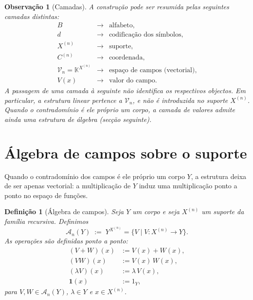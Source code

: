 \documentclass[11pt,a4paper]{article}
\newtheorem{definicao}{Definição}
\newtheorem{observacao}{Observação}
\begin{document}
\begin{observacao}[Camadas]
\label{obs:camadas-campo}
A construção pode ser resumida pelas seguintes camadas distintas:
\[
\begin{array}{rcl}
B &\longrightarrow& \text{alfabeto},\\[0.3em]
d &\longrightarrow& \text{codificação dos símbolos},\\[0.3em]
X^{(n)} &\longrightarrow& \text{suporte},\\[0.3em]
C^{(n)} &\longrightarrow& \text{coordenada},\\[0.3em]
\mathcal V_n=\mathbb K^{X^{(n)}} &\longrightarrow& \text{espaço de campos (vectorial)},\\[0.3em]
V(x) &\longrightarrow& \text{valor do campo}.
\end{array}
\]
A passagem de uma camada à seguinte não identifica os respectivos objectos.
Em particular, a estrutura linear pertence a \(\mathcal V_n\), e não é introduzida no suporte \(X^{(n)}\).
Quando o contradomínio é ele próprio um corpo, a camada de valores admite ainda uma estrutura de álgebra (secção seguinte).
\end{observacao}

\section{Álgebra de campos sobre o suporte}

Quando o contradomínio dos campos é ele próprio um corpo \(Y\), a estrutura deixa de ser apenas vectorial: a multiplicação de \(Y\) induz uma multiplicação ponto a ponto no espaço de funções.

\begin{definicao}[Álgebra de campos]
\label{def:algebra-campos}
Seja \(Y\) um corpo e seja \(X^{(n)}\) um suporte da família recursiva.
Definimos
\[
\mathcal A_n(Y)
\;:=\;
Y^{X^{(n)}}
=
\{V\mid V\colon X^{(n)}\to Y\}.
\]
As operações são definidas ponto a ponto:
\begin{align*}
(V+W)(x)
&:=
V(x)+W(x),\\
(VW)(x)
&:=
V(x)\,W(x),\\
(\lambda V)(x)
&:=
\lambda\,V(x),\\
\mathbf 1(x)
&:=
1_Y,
\end{align*}
para \(V,W\in\mathcal A_n(Y)\), \(\lambda\in Y\) e \(x\in X^{(n)}\).
\end{definicao}
\end{document}
